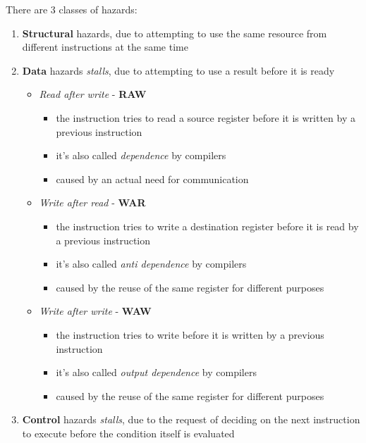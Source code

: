 \documentclass[english]{article}
\begin{document}
There are \(3\) classes of hazards:
\begin{enumerate}
  \item \textbf{Structural} hazards, due to attempting to use the same resource from different instructions at the same time
  \item \textbf{Data} hazards \textit{stalls}, due to attempting to use a result before it is ready
        \begin{itemize}
          \item \textit{Read after write} - \textbf{RAW}
                \begin{itemize}[label=\(\rightarrow\)]
                  \item the instruction tries to read a source register before it is written by a previous instruction
                  \item it's also called \textit{dependence} by compilers
                  \item caused by an actual need for communication
                \end{itemize}
          \item \textit{Write after read} - \textbf{WAR}
                \begin{itemize}[label=\(\rightarrow\)]
                  \item the instruction tries to write a destination register before it is read by a previous instruction
                  \item it's also called \textit{anti dependence} by compilers
                  \item caused by the reuse of the same register for different purposes
                \end{itemize}
          \item \textit{Write after write} - \textbf{WAW}
                \begin{itemize}[label=\(\rightarrow\)]
                  \item the instruction tries to write before it is written by a previous instruction
                  \item it's also called \textit{output dependence} by compilers
                  \item caused by the reuse of the same register for different purposes
                \end{itemize}
        \end{itemize}
  \item \textbf{Control} hazards \textit{stalls}, due to the request of deciding on the next instruction to execute before the condition itself is evaluated
\end{enumerate}
\end{document}
